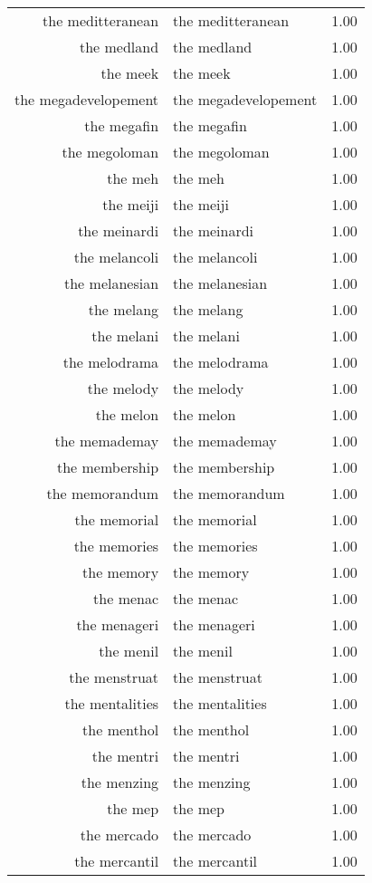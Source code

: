 \begin{table}[ht]
\begin{tabular}{rlr}
  the meditteranean & the meditteranean & 1.00 \\ 
  the medland & the medland & 1.00 \\ 
  the meek & the meek & 1.00 \\ 
  the megadevelopement & the megadevelopement & 1.00 \\ 
  the megafin & the megafin & 1.00 \\ 
  the megoloman & the megoloman & 1.00 \\ 
  the meh & the meh & 1.00 \\ 
  the meiji & the meiji & 1.00 \\ 
  the meinardi & the meinardi & 1.00 \\ 
  the melancoli & the melancoli & 1.00 \\ 
  the melanesian & the melanesian & 1.00 \\ 
  the melang & the melang & 1.00 \\ 
  the melani & the melani & 1.00 \\ 
  the melodrama & the melodrama & 1.00 \\ 
  the melody & the melody & 1.00 \\ 
  the melon & the melon & 1.00 \\ 
  the memademay & the memademay & 1.00 \\ 
  the membership & the membership & 1.00 \\ 
  the memorandum & the memorandum & 1.00 \\ 
  the memorial & the memorial & 1.00 \\ 
  the memories & the memories & 1.00 \\ 
  the memory & the memory & 1.00 \\ 
  the menac & the menac & 1.00 \\ 
  the menageri & the menageri & 1.00 \\ 
  the menil & the menil & 1.00 \\ 
  the menstruat & the menstruat & 1.00 \\ 
  the mentalities & the mentalities & 1.00 \\ 
  the menthol & the menthol & 1.00 \\ 
  the mentri & the mentri & 1.00 \\ 
  the menzing & the menzing & 1.00 \\ 
  the mep & the mep & 1.00 \\ 
  the mercado & the mercado & 1.00 \\ 
  the mercantil & the mercantil & 1.00 \\ 

\end{tabular}
\end{table}
